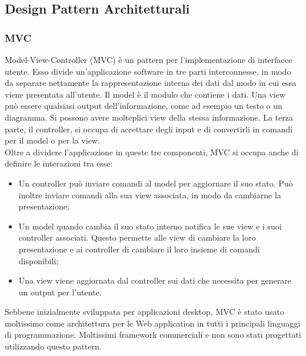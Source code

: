\documentclass[12pt,a4paper]{article}
\begin{document}
\subsection{Design Pattern Architetturali}
\subsubsection{MVC}
Model-View-Controller (MVC) è un pattern per l’implementazione di interfacce utente. Esso divide un’applicazione software in tre parti interconnesse, in modo da separare nettamente la rappresentazione interna dei dati dal modo in cui essa viene presentata all’utente. Il model è il modulo che contiene i dati. Una view può essere qualsiasi output dell’informazione, come ad esempio un testo o un diagramma. Si possono avere molteplici view della stessa informazione. La terza parte, il controller, si occupa di accettare degli input e di convertirli in comandi per il model o per la view.\\
Oltre a dividere l’applicazione in queste tre componenti, MVC si occupa anche di definire le interazioni tra esse:
\begin{itemize}
	\item Un controller può inviare comandi al model per aggiornare il suo stato. Può inoltre inviare comandi alla sua view associata, in modo da cambiarne la presentazione;
	\item Un model quando cambia il suo stato interno notifica le sue view e i suoi controller associati. Questo permette alle view di cambiare la loro presentazione e ai controller di cambiare il loro insieme di comandi disponibili;
	\item Una view viene aggiornata dal controller sui dati che necessita per generare un output per l’utente.
\end{itemize}
Sebbene inizialmente sviluppata per applicazioni desktop, MVC è stato usato moltissimo come architettura per le Web application in tutti i principali linguaggi di programmazione. Moltissimi framework commerciali e non sono stati progettati utilizzando questo pattern.
\end{document}
